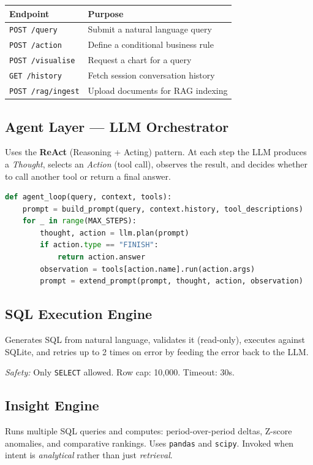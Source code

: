 \documentclass[11pt,a4paper]{article}
\begin{document}
\begin{center}
\begin{tabular}{ll}
\toprule
\textbf{Endpoint} & \textbf{Purpose} \\
\midrule
\texttt{POST /query}       & Submit a natural language query \\
\texttt{POST /action}      & Define a conditional business rule \\
\texttt{POST /visualise}   & Request a chart for a query \\
\texttt{GET  /history}     & Fetch session conversation history \\
\texttt{POST /rag/ingest}  & Upload documents for RAG indexing \\
\bottomrule
\end{tabular}
\end{center}

\subsection{Agent Layer --- LLM Orchestrator}
Uses the \textbf{ReAct} (Reasoning + Acting) pattern. At each step the LLM produces a \textit{Thought}, selects an \textit{Action} (tool call), observes the result, and decides whether to call another tool or return a final answer.

\begin{lstlisting}[language=Python]
def agent_loop(query, context, tools):
    prompt = build_prompt(query, context.history, tool_descriptions)
    for _ in range(MAX_STEPS):
        thought, action = llm.plan(prompt)
        if action.type == "FINISH":
            return action.answer
        observation = tools[action.name].run(action.args)
        prompt = extend_prompt(prompt, thought, action, observation)
\end{lstlisting}

\subsection{SQL Execution Engine}
Generates SQL from natural language, validates it (read-only), executes against SQLite, and retries up to 2 times on error by feeding the error back to the LLM.

\textit{Safety:} Only \texttt{SELECT} allowed. Row cap: 10,000. Timeout: 30s.

\subsection{Insight Engine}
Runs multiple SQL queries and computes: period-over-period deltas, Z-score anomalies, and comparative rankings. Uses \texttt{pandas} and \texttt{scipy}. Invoked when intent is \textit{analytical} rather than just \textit{retrieval}.
\end{document}
